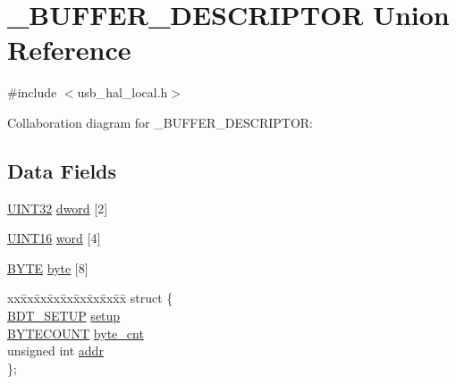 \hypertarget{union___b_u_f_f_e_r___d_e_s_c_r_i_p_t_o_r}{}\section{\+\_\+\+B\+U\+F\+F\+E\+R\+\_\+\+D\+E\+S\+C\+R\+I\+P\+T\+O\+R Union Reference}
\label{union___b_u_f_f_e_r___d_e_s_c_r_i_p_t_o_r}


{\ttfamily \#include $<$usb\+\_\+hal\+\_\+local.\+h$>$}



Collaboration diagram for \+\_\+\+B\+U\+F\+F\+E\+R\+\_\+\+D\+E\+S\+C\+R\+I\+P\+T\+O\+R\+:
\subsection*{Data Fields}
\begin{DoxyCompactItemize}
\item 
\hyperlink{_generic_type_defs_8h_a1720f33f59b583f0c2ed071815623a86}{U\+I\+N\+T32} \hyperlink{union___b_u_f_f_e_r___d_e_s_c_r_i_p_t_o_r_a5ac953c09b938557d7b7d37937ed0729}{dword} \mbox{[}2\mbox{]}
\item 
\hyperlink{_generic_type_defs_8h_acfa284fa8026c4aace2728f7f15d6c13}{U\+I\+N\+T16} \hyperlink{union___b_u_f_f_e_r___d_e_s_c_r_i_p_t_o_r_a705536d4baff017681ac12a95f7f76ef}{word} \mbox{[}4\mbox{]}
\item 
\hyperlink{_generic_type_defs_8h_a4ae1dab0fb4b072a66584546209e7d58}{B\+Y\+T\+E} \hyperlink{union___b_u_f_f_e_r___d_e_s_c_r_i_p_t_o_r_a1b091cb78cd83c23d339ef1fadd0e319}{byte} \mbox{[}8\mbox{]}
\item 
\begin{tabbing}
xx\=xx\=xx\=xx\=xx\=xx\=xx\=xx\=xx\=\kill
struct \{\\
\>\hyperlink{usb__hal__local_8h_a2ba272e0ad72658aa799273136e777da}{BDT\_SETUP} \hyperlink{union___b_u_f_f_e_r___d_e_s_c_r_i_p_t_o_r_a817f7ae67d58d27d1cf1764b7938edc0}{setup}\\
\>\hyperlink{usb__hal__local_8h_ab594ecb8ce5417d427dfee9cf287a555}{BYTECOUNT} \hyperlink{union___b_u_f_f_e_r___d_e_s_c_r_i_p_t_o_r_a517720ad456dad60243bfda4428fe972}{byte\_cnt}\\
\>unsigned int \hyperlink{union___b_u_f_f_e_r___d_e_s_c_r_i_p_t_o_r_ab36863a07751ac73459d46b677c33b57}{addr}\\
\}; \\

\end{tabbing}\end{DoxyCompactItemize}



